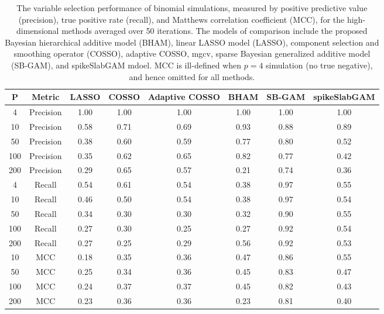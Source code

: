\begin{table}[ht]
\centering
\begin{tabular}{cccccccc}
  \hline
P & Metric & LASSO & COSSO & Adaptive COSSO & BHAM & SB-GAM & spikeSlabGAM \\ 
  \hline
  4 & Precision & 1.00 & 1.00 & 1.00 & 1.00 & 1.00 & 1.00 \\ 
   10 & Precision & 0.58 & 0.71 & 0.69 & 0.93 & 0.88 & 0.89 \\ 
   50 & Precision & 0.38 & 0.60 & 0.59 & 0.77 & 0.80 & 0.52 \\ 
  100 & Precision & 0.35 & 0.62 & 0.65 & 0.82 & 0.77 & 0.42 \\ 
  200 & Precision & 0.29 & 0.65 & 0.57 & 0.21 & 0.74 & 0.36 \\ 
    4 & Recall & 0.54 & 0.61 & 0.54 & 0.38 & 0.97 & 0.55 \\ 
   10 & Recall & 0.46 & 0.50 & 0.54 & 0.38 & 0.97 & 0.54 \\ 
   50 & Recall & 0.34 & 0.30 & 0.30 & 0.32 & 0.90 & 0.55 \\ 
  100 & Recall & 0.27 & 0.30 & 0.25 & 0.27 & 0.92 & 0.54 \\ 
  200 & Recall & 0.27 & 0.25 & 0.29 & 0.56 & 0.92 & 0.53 \\ 
   10 & MCC & 0.18 & 0.35 & 0.36 & 0.47 & 0.86 & 0.55 \\ 
   50 & MCC & 0.25 & 0.34 & 0.36 & 0.45 & 0.83 & 0.47 \\ 
  100 & MCC & 0.24 & 0.37 & 0.37 & 0.45 & 0.82 & 0.43 \\ 
  200 & MCC & 0.23 & 0.36 & 0.36 & 0.23 & 0.81 & 0.40 \\ 
   \hline
\end{tabular}
\caption{The variable selection performance of binomial simulations, measured by positive predictive value (precision), true positive rate (recall), and Matthews correlation coefficient (MCC), for the high-dimensional methods averaged over 50 iterations. The models of comparison include the proposed Bayesian hierarchical additive model (BHAM), linear LASSO model (LASSO), component selection and smoothing operator (COSSO), adaptive COSSO, mgcv, sparse Bayesian generalized additive model (SB-GAM), and spikeSlabGAM mdoel. MCC is ill-defined when $p=4$ simulation (no true negative), and hence omitted for all methods.} 
\label{tab:sim_binom_var_select}
\end{table}
